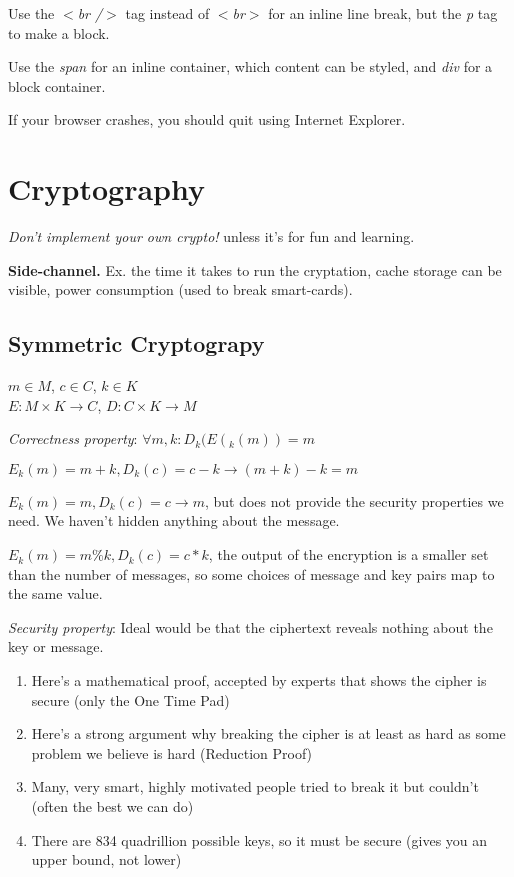 \documentclass[12pt]{article}
\begin{document}
Use the \emph{$<$br /$>$} tag instead of \emph{$<$br$>$} for an inline line break, but the \emph{p} tag to make a block.

Use the \emph{span} for an inline container, which content can be styled, and \emph{div} for a block container.

If your browser crashes, you should quit using Internet Explorer.

\section{Cryptography}

\textit{Don't implement your own crypto!} unless it's for fun and learning.

\textbf{Side-channel.} Ex. the time it takes to run the cryptation, cache storage can be visible, power consumption (used to break smart-cards).

\subsection{Symmetric Cryptograpy}

$m \in M$, $c \in C$, $k \in K$ \\
$E: M \times K \rightarrow C$, $D: C \times K \rightarrow M$

\textit{Correctness property}: $\forall m,k: D_k(E(_k(m)) = m$
\begin{list}{*}{
\setlength{\itemsep}{0pt}
\setlength{\parsep}{0pt}
\setlength{\topsep}{0pt}
\setlength{\partopsep}{0pt}
\setlength{\leftmargin}{2em}
\setlength{\labelwidth}{1.5em}
\setlength{\labelsep}{0.5em}
}
\item $E_k(m) = m + k, D_k(c) = c - k \rightarrow (m + k) - k = m$
\item $E_k(m) = m, D_k(c) = c \rightarrow m$, but does not provide the security properties we need. We haven't hidden anything about the message.
\item \sout{$E_k(m) = m \% k, D_k(c) = c * k$}, the output of the encryption is a smaller set than the number of messages, so some choices of message and key pairs map to the same value.
\end{list}

\textit{Security property}: Ideal would be that the ciphertext reveals nothing about the key or message.

\begin{enumerate}
\item Here's a mathematical proof, accepted by experts that shows the cipher is secure (only the One Time Pad)
\item Here's a strong argument why breaking the cipher is at least as hard as some problem we believe is hard (Reduction Proof)
\item Many, very smart, highly motivated people tried to break it but couldn't (often the best we can do)
\item There are 834 quadrillion possible keys, so it must be secure (gives you an upper bound, not lower)
\end{enumerate}
\end{document}
